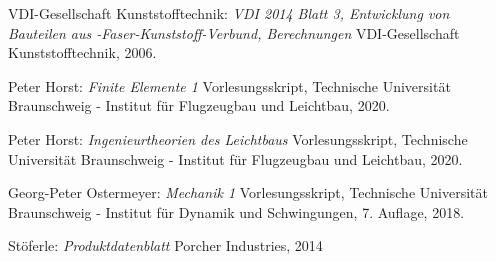 \begin{thebibliography}{99}
	VDI-Gesellschaft Kunststofftechnik:
	\textit{VDI 2014 Blatt 3, Entwicklung von Bauteilen aus -Faser-Kunststoff-Verbund, Berechnungen}
	VDI-Gesellschaft Kunststofftechnik, 2006.
	
	Peter Horst:
	\textit{Finite Elemente 1}
	Vorlesungsskript, Technische Universität Braunschweig - Institut für Flugzeugbau und Leichtbau, 2020.
	
	Peter Horst:
	\textit{Ingenieurtheorien des Leichtbaus}
	Vorlesungsskript, Technische Universität Braunschweig - Institut für Flugzeugbau und Leichtbau, 2020.
	
	Georg-Peter Ostermeyer:
	\textit{Mechanik 1}
	Vorlesungsskript, Technische Universität Braunschweig - Institut für Dynamik und Schwingungen, 7. Auflage, 2018.
	
	Stöferle:
	\textit{Produktdatenblatt}
	Porcher Industries, 2014
	
	
\end{thebibliography}
\endgroup